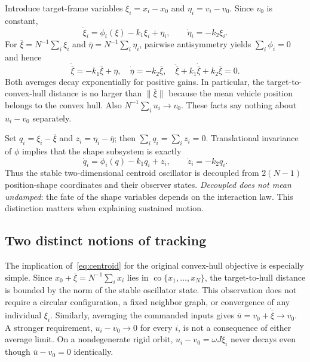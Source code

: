\documentclass[conference]{IEEEtran}
\newcommand{\norm}[1]{\lVert#1\rVert}
\newcommand{\avg}[1]{\overline{#1}}
\begin{document}
Introduce target-frame variables $\xi_i=x_i-x_0$ and $\eta_i=v_i-v_0$. Since $v_0$ is constant,
\begin{equation}
 \dot\xi_i=\phi_i(\xi)-k_1\xi_i+\eta_i,
 \qquad \dot\eta_i=-k_2\xi_i.\label{eq:relative}
\end{equation}
For $\avg\xi=N^{-1}\sum_i\xi_i$ and $\avg\eta=N^{-1}\sum_i\eta_i$, pairwise antisymmetry yields $\sum_i\phi_i=0$ and hence
\begin{equation}
 \dot{\avg\xi}=-k_1\avg\xi+\avg\eta,
 \quad\dot{\avg\eta}=-k_2\avg\xi,
 \quad\ddot{\avg\xi}+k_1\dot{\avg\xi}+k_2\avg\xi=0.
 \label{eq:centroid}
\end{equation}
Both averages decay exponentially for positive gains. In particular, the target-to-convex-hull distance is no larger than $\norm{\avg\xi}$ because the mean vehicle position belongs to the convex hull. Also $N^{-1}\sum_i u_i\to v_0$. These facts say nothing about $u_i-v_0$ separately.

Set $q_i=\xi_i-\avg\xi$ and $z_i=\eta_i-\avg\eta$; then $\sum_iq_i=\sum_i z_i=0$. Translational invariance of $\phi$ implies that the shape subsystem is exactly
\begin{equation}
 \dot q_i=\phi_i(q)-k_1q_i+z_i,
 \qquad\dot z_i=-k_2q_i.\label{eq:shape}
\end{equation}
Thus the stable two-dimensional centroid oscillator is decoupled from $2(N-1)$ position-shape coordinates and their observer states. \emph{Decoupled does not mean undamped}: the fate of the shape variables depends on the interaction law. This distinction matters when explaining sustained motion.

\subsection{Two distinct notions of tracking}
The implication of~\eqref{eq:centroid} for the original convex-hull objective is especially simple. Since $x_0+\avg\xi=N^{-1}\sum_i x_i$ lies in $\operatorname{co}\{x_1,\ldots,x_N\}$, the target-to-hull distance is bounded by the norm of the stable oscillator state. This observation does not require a circular configuration, a fixed neighbor graph, or convergence of any individual $\xi_i$. Similarly, averaging the commanded inputs gives $\avg u=v_0+\dot{\avg\xi}\to v_0$. A stronger requirement, $u_i-v_0\to0$ for every $i$, is not a consequence of either average limit. On a nondegenerate rigid orbit, $u_i-v_0=\omega J\xi_i$ never decays even though $\avg u-v_0=0$ identically.
\end{document}
